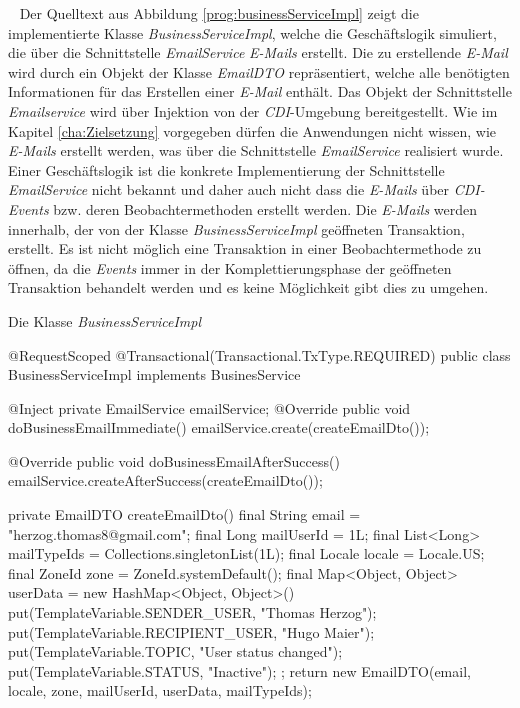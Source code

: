 \ \newline
Der Quelltext aus Abbildung \ref{prog:businessServiceImpl} zeigt die implementierte Klasse \emph{BusinessServiceImpl}, welche die Geschäftslogik simuliert, die über die Schnittstelle \emph{EmailService} \emph{E-Mails} erstellt. Die zu erstellende \emph{E-Mail} wird durch ein Objekt der Klasse \emph{EmailDTO} repräsentiert, welche alle benötigten Informationen für das Erstellen einer \emph{E-Mail} enthält. Das Objekt der Schnittstelle \emph{Emailservice} wird über Injektion von der \emph{CDI}-Umgebung bereitgestellt. Wie im Kapitel \ref{cha:Zielsetzung} vorgegeben dürfen die Anwendungen nicht wissen, wie \emph{E-Mails} erstellt werden, was über die Schnittstelle \emph{EmailService} realisiert wurde. Einer Geschäftslogik ist die konkrete Implementierung der Schnittstelle \emph{EmailService} nicht bekannt und daher auch nicht dass die \emph{E-Mails} über \emph{CDI-Events} bzw. deren Beobachtermethoden erstellt werden.
\newline
\newline
Die \emph{E-Mails} werden innerhalb, der von der Klasse \emph{BusinessServiceImpl} geöffneten Transaktion, erstellt. Es ist nicht möglich eine Transaktion in einer Beobachtermethode zu öffnen, da die \emph{Events} immer in der Komplettierungsphase der geöffneten Transaktion behandelt werden und es keine Möglichkeit gibt dies zu umgehen.
\newpage
\begin{program}[h]
\caption{Die Klasse \emph{BusinessServiceImpl}}
\label{prog:businessServiceImpl}
\begin{JavaCode}
@RequestScoped
@Transactional(Transactional.TxType.REQUIRED)
public class BusinessServiceImpl implements BusinesService {
    @Inject
    private EmailService emailService;
    @Override
    public void doBusinessEmailImmediate() {
        emailService.create(createEmailDto());
    }

    @Override
    public void doBusinessEmailAfterSuccess() {
        emailService.createAfterSuccess(createEmailDto());
    }

    private EmailDTO createEmailDto() {
        final String email = "herzog.thomas8@gmail.com";
        final Long mailUserId = 1L;
        final List<Long> mailTypeIds = Collections.singletonList(1L);
        final Locale locale = Locale.US;
        final ZoneId zone = ZoneId.systemDefault();
        final Map<Object, Object> userData = 
        	new HashMap<Object, Object>() {{
                put(TemplateVariable.SENDER_USER, "Thomas Herzog");
                put(TemplateVariable.RECIPIENT_USER, "Hugo Maier");
                put(TemplateVariable.TOPIC, "User status changed");
                put(TemplateVariable.STATUS, "Inactive");
            }};
        return new EmailDTO(email, 
        					locale, 
        					zone, 
        					mailUserId, 
        					userData, 
        					mailTypeIds);
    }
}
\end{JavaCode}
\end{program}
